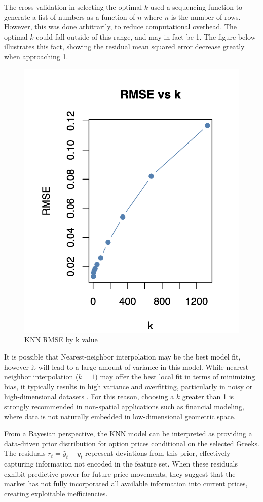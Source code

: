 \documentclass{article}
\begin{document}
The cross validation in selecting the optimal $k$ used a sequencing function to generate a list of numbers as a function of $n$ where $n$ is the number of rows. However, this was done arbitrarily, to reduce computational overhead. The optimal $k$ could fall outside of this range, and may in fact be 1. The figure below illustrates this fact, showing the residual mean squared error decrease greatly when approaching 1.

\begin{figure}[h]
  \centering
  \includegraphics[width=0.8\linewidth]{data/results/knn_rmse.png}
  \caption{KNN RMSE by k value}
  \label{fig:knn-rmse}
\end{figure}

It is possible that Nearest-neighbor interpolation may be the best model fit, however it will lead to a large amount of variance in this model. While nearest-neighbor interpolation (\( k = 1 \)) may offer the best local fit in terms of minimizing bias, it typically results in high variance and overfitting, particularly in noisy or high-dimensional datasets \cite{caruana2006empirical}. For this reason, choosing a $k$ greater than 1 is strongly recommended in non-spatial applications such as financial modeling, where data is not naturally embedded in low-dimensional geometric space.

From a Bayesian perspective, the KNN model can be interpreted as providing a data-driven prior distribution for option prices conditional on the selected Greeks. The residuals $r_t = \hat{y}_t - y_t$ represent deviations from this prior, effectively capturing information not encoded in the feature set. When these residuals exhibit predictive power for future price movements, they suggest that the market has not fully incorporated all available information into current prices, creating exploitable inefficiencies.
\end{document}
